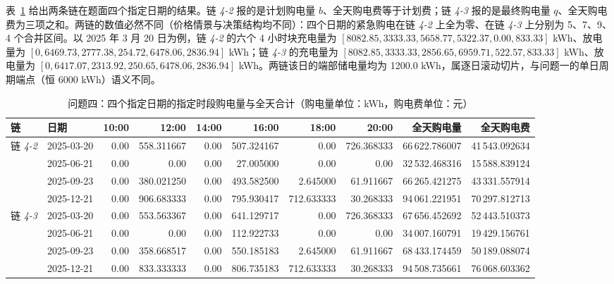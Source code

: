 表~\ref{tab:p4a} 给出两条链在题面四个指定日期的结果。链 \emph{4-2} 报的是计划购电量 $b$、全天购电费等于计划费；链 \emph{4-3} 报的是最终购电量 $q$、全天购电费为三项之和。两链的数值必然不同（价格情景与决策结构均不同）：四个日期的紧急购电在链 \emph{4-2} 上全为零、在链 \emph{4-3} 上分别为 5、7、9、4 个合并区间。以 2025 年 3 月 20 日为例，链 \emph{4-2} 的六个 4 小时块充电量为 $[8082.85,\allowbreak 3333.33,\allowbreak 5658.77,\allowbreak 5322.37,\allowbreak 0.00,\allowbreak 833.33]$ kWh、放电量为 $[0,\allowbreak 6469.73,\allowbreak 2777.38,\allowbreak 254.72,\allowbreak 6478.06,\allowbreak 2836.94]$ kWh；链 \emph{4-3} 的充电量为 $[8082.85,\allowbreak 3333.33,\allowbreak 2856.65,\allowbreak 6959.71,\allowbreak 522.57,\allowbreak 833.33]$ kWh、放电量为 $[0,\allowbreak 6417.07,\allowbreak 2313.92,\allowbreak 250.65,\allowbreak 6478.06,\allowbreak 2836.94]$ kWh。两链该日的端部储电量均为 1200.0 kWh，属逐日滚动切片，与问题一的单日周期端点（恒 6000 kWh）语义不同。

\begin{table}[htbp]
\centering
\footnotesize
\caption{问题四：四个指定日期的指定时段购电量与全天合计（购电量单位：kWh，购电费单位：元）}
\label{tab:p4a}\tighttable\begin{tabular}{llrrrrrrrr}
\toprule
链 & 日期 & 10:00 & 12:00 & 14:00 & 16:00 & 18:00 & 20:00 & 全天购电量 & 全天购电费 \\
\midrule
\multirow{4}{*}{链 \emph{4-2}} & 2025-03-20 & 0.00 & 558.311667 & 0.00 & 507.324167 & 0.00 & 726.368333 & 66\,622.786007 & 41\,543.092634 \\
 & 2025-06-21 & 0.00 & 0.00 & 0.00 & 27.005000 & 0.00 & 0.00 & 32\,532.468316 & 15\,588.839124 \\
 & 2025-09-23 & 0.00 & 380.021250 & 0.00 & 493.582500 & 2.645000 & 61.911667 & 66\,265.421275 & 43\,331.557914 \\
 & 2025-12-21 & 0.00 & 906.683333 & 0.00 & 795.930417 & 712.633333 & 30.268333 & 94\,061.221951 & 70\,297.812713 \\
\midrule
\multirow{4}{*}{链 \emph{4-3}} & 2025-03-20 & 0.00 & 553.563367 & 0.00 & 641.129717 & 0.00 & 726.368333 & 67\,656.452692 & 52\,443.510373 \\
 & 2025-06-21 & 0.00 & 0.00 & 0.00 & 112.922733 & 0.00 & 0.00 & 34\,007.160791 & 19\,429.156761 \\
 & 2025-09-23 & 0.00 & 358.668517 & 0.00 & 550.185183 & 2.645000 & 61.911667 & 68\,433.174459 & 50\,189.088074 \\
 & 2025-12-21 & 0.00 & 833.333333 & 0.00 & 806.735183 & 712.633333 & 30.268333 & 94\,508.735661 & 76\,068.603362 \\
\bottomrule
\end{tabular}
\end{table}

